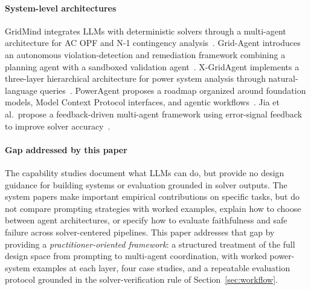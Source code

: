 \documentclass[journal,onecolumn]{IEEEtran} %
\begin{document}

\paragraph{System-level architectures}
GridMind integrates LLMs with deterministic solvers through a multi-agent architecture for AC OPF and N-1 contingency analysis~\cite{jin2025gridmind}. Grid-Agent introduces an autonomous violation-detection and remediation framework combining a planning agent with a sandboxed validation agent~\cite{zhang2025gridagent}. X-GridAgent implements a three-layer hierarchical architecture for power system analysis through natural-language queries~\cite{chen2025xgridagent}. PowerAgent proposes a roadmap organized around foundation models, Model Context Protocol interfaces, and agentic workflows~\cite{zhang2025poweragent}. Jia et al.\ propose a feedback-driven multi-agent framework using error-signal feedback to improve solver accuracy~\cite{jia2025feedback}.

\paragraph{Gap addressed by this paper}
The capability studies document what LLMs can do, but provide no design guidance for building systems or evaluation grounded in solver outputs. The system papers make important empirical contributions on specific tasks, but do not compare prompting strategies with worked examples, explain how to choose between agent architectures, or specify how to evaluate faithfulness and safe failure across solver-centered pipelines. This paper addresses that gap by providing a \textit{practitioner-oriented framework}: a structured treatment of the full design space from prompting to multi-agent coordination, with worked power-system examples at each layer, four case studies, and a repeatable evaluation protocol grounded in the solver-verification rule of Section~\ref{sec:workflow}.
\end{document}

